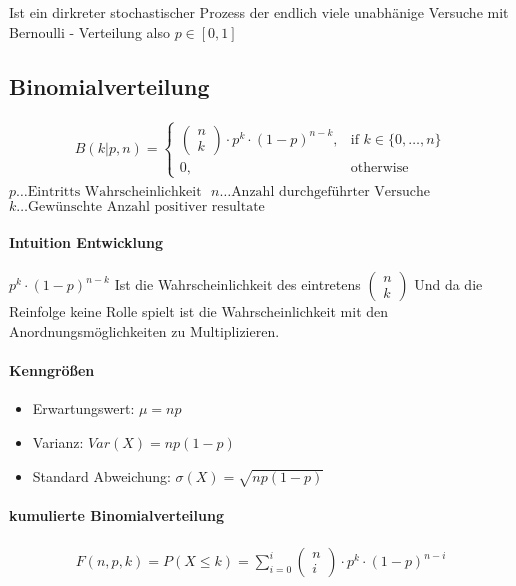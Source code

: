 \documentclass[12pt]{article}
\begin{document}
Ist ein dirkreter stochastischer Prozess der endlich viele unabhänige Versuche mit Bernoulli - Verteilung also \( p \in [0, 1] \)

\subsection*{ Binomialverteilung }

\begin{align*}
	B(k \vert p, n) = 
	\begin{cases}
    \begin{pmatrix}
	n \\ k 
	\end{pmatrix} \cdot p^k \cdot (1 - p)^{n-k},& \text{if } k \in \lbrace 0, \dots, n \rbrace \\
    0,              & \text{otherwise}
	\end{cases}	
\end{align*}
\( p \dots \text{Eintritts Wahrscheinlichkeit } \) \newline
\( n \dots \text{Anzahl durchgeführter Versuche} \) \newline
\( k \dots \text{Gewünschte Anzahl positiver resultate}\)

\paragraph{ Intuition Entwicklung }

\( p^k \cdot (1 - p)^{n-k} \) Ist die Wahrscheinlichkeit des eintretens 
\( \begin{pmatrix}
	n \\ k 
\end{pmatrix} \) Und da die Reinfolge keine Rolle spielt ist die Wahrscheinlichkeit mit den Anordnungsmöglichkeiten zu Multiplizieren. \newline

\paragraph{Kenngrößen}
\begin{itemize}
	\item Erwartungswert: \( \mu = np \)
	\item Varianz: \( Var(X) = np(1-p)  \)
	\item Standard Abweichung: \( \sigma(X) = \sqrt{np(1-p)}  \)
\end{itemize}

\paragraph{kumulierte Binomialverteilung}
\begin{align*}
	F(n,p,k) = P(X \leq k) = \sum_{i=0}^{i} \begin{pmatrix}
	n \\ i 
	\end{pmatrix} \cdot p^k \cdot (1 - p)^{n-i}
\end{align*}
\end{document}
